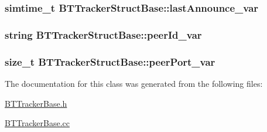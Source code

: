 \subsubsection[{last\+Announce\+\_\+var}]{\setlength{\rightskip}{0pt plus 5cm}simtime\+\_\+t B\+T\+Tracker\+Struct\+Base\+::last\+Announce\+\_\+var\hspace{0.3cm}{\ttfamily [protected]}}\label{classBTTrackerStructBase_aa46de4fbdf226d5fc79df612538c2005}
\hypertarget{classBTTrackerStructBase_ae905721d92c8e64e682061215203ebde}{}
\subsubsection[{peer\+Id\+\_\+var}]{\setlength{\rightskip}{0pt plus 5cm}string B\+T\+Tracker\+Struct\+Base\+::peer\+Id\+\_\+var\hspace{0.3cm}{\ttfamily [protected]}}\label{classBTTrackerStructBase_ae905721d92c8e64e682061215203ebde}
\hypertarget{classBTTrackerStructBase_ad6c17ccdd1cc1a6ae18a5d08c6eabfcc}{}
\subsubsection[{peer\+Port\+\_\+var}]{\setlength{\rightskip}{0pt plus 5cm}size\+\_\+t B\+T\+Tracker\+Struct\+Base\+::peer\+Port\+\_\+var\hspace{0.3cm}{\ttfamily [protected]}}\label{classBTTrackerStructBase_ad6c17ccdd1cc1a6ae18a5d08c6eabfcc}


The documentation for this class was generated from the following files\+:\begin{DoxyCompactItemize}
\item 
\hyperlink{BTTrackerBase_8h}{B\+T\+Tracker\+Base.\+h}\item 
\hyperlink{BTTrackerBase_8cc}{B\+T\+Tracker\+Base.\+cc}\end{DoxyCompactItemize}
